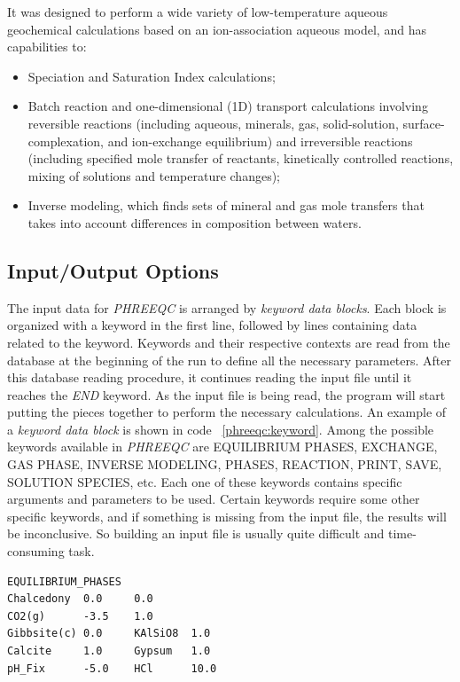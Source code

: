 It was designed to perform a wide variety of low-temperature aqueous geochemical calculations based on an ion-association aqueous model, and has capabilities to:
\begin{itemize}
\item Speciation and Saturation Index calculations;
\item Batch reaction and one-dimensional (1D) transport calculations involving reversible reactions (including aqueous, minerals, gas, solid-solution, surface-complexation, and ion-exchange equilibrium) and irreversible reactions (including specified mole transfer of reactants, kinetically controlled reactions, mixing of solutions and temperature changes);
\item Inverse modeling, which finds sets of mineral and gas mole transfers that takes into account differences in composition between waters.
\end{itemize}

\subsection{Input/Output Options}
The input data for \emph{PHREEQC} is arranged by \emph{keyword data blocks}. Each block is organized with a keyword in the first line, followed by lines containing data related to the keyword. Keywords and their respective contexts are read from the database at the beginning of the run to define all the necessary parameters. After this database reading procedure, it continues reading the input file until it reaches the \emph{END} keyword. As the input file is being read, the program will start putting the pieces together to perform the necessary calculations. An example of a \emph{keyword data block} is shown in code ~\ref{phreeqc:keyword}. Among the possible keywords available in \emph{PHREEQC} are EQUILIBRIUM PHASES, EXCHANGE, GAS PHASE, INVERSE MODELING, PHASES, REACTION, PRINT, SAVE, SOLUTION SPECIES, etc. Each one of these keywords contains specific arguments and parameters to be used. Certain keywords require some other specific keywords, and if something is missing from the input file, the results will be inconclusive. So building an input file is usually quite difficult and time-consuming task. 

\begin{minipage}[c]{0.92\textwidth}
\begin{lstlisting}[frame=single, caption=\emph{PHREEQC} keyword data block example, label=phreeqc:keyword]
EQUILIBRIUM_PHASES
Chalcedony  0.0     0.0
CO2(g)      -3.5    1.0
Gibbsite(c) 0.0     KAlSiO8  1.0
Calcite     1.0     Gypsum   1.0
pH_Fix      -5.0    HCl      10.0
\end{lstlisting}
\end{minipage}


